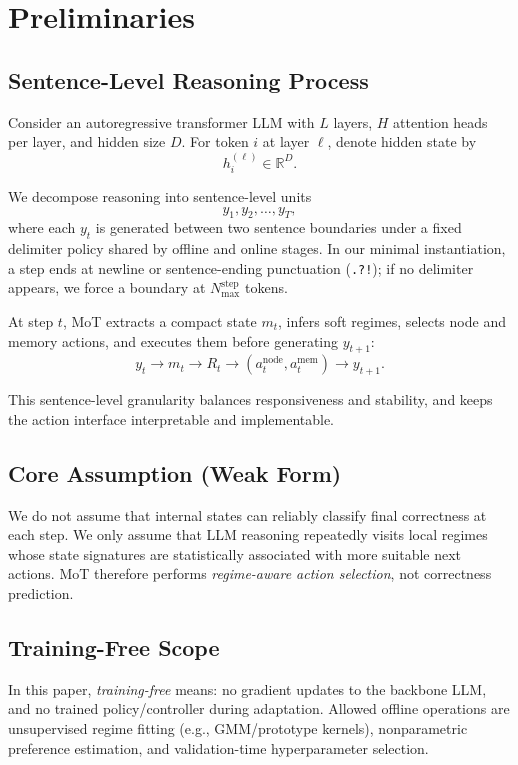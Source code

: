 \documentclass{article}
\newcommand{\R}{\mathbb{R}}
\begin{document}
\section{Preliminaries}
\label{sec:prelim}

\subsection{Sentence-Level Reasoning Process}
Consider an autoregressive transformer LLM with $L$ layers, $H$ attention heads per layer, and hidden size $D$. 
For token $i$ at layer $\ell$, denote hidden state by
\[
h^{(\ell)}_{i} \in \R^{D}.
\]

We decompose reasoning into sentence-level units
\[
y_{1}, y_{2}, \dots, y_{T},
\]
where each $y_t$ is generated between two sentence boundaries under a fixed delimiter policy shared by offline and online stages. In our minimal instantiation, a step ends at newline or sentence-ending punctuation (\texttt{.?!}); if no delimiter appears, we force a boundary at $N_{\max}^{\mathrm{step}}$ tokens.

At step $t$, MoT extracts a compact state $m_t$, infers soft regimes, selects node and memory actions, and executes them before generating $y_{t+1}$:
\[
y_t \rightarrow m_t \rightarrow R_t \rightarrow (a_t^{\text{node}}, a_t^{\text{mem}}) \rightarrow y_{t+1}.
\]

This sentence-level granularity balances responsiveness and stability, and keeps the action interface interpretable and implementable.

\subsection{Core Assumption (Weak Form)}
We do not assume that internal states can reliably classify final correctness at each step. We only assume that LLM reasoning repeatedly visits local regimes whose state signatures are statistically associated with more suitable next actions. MoT therefore performs \emph{regime-aware action selection}, not correctness prediction.

\subsection{Training-Free Scope}
In this paper, \emph{training-free} means: no gradient updates to the backbone LLM, and no trained policy/controller during adaptation. Allowed offline operations are unsupervised regime fitting (e.g., GMM/prototype kernels), nonparametric preference estimation, and validation-time hyperparameter selection.
\end{document}
